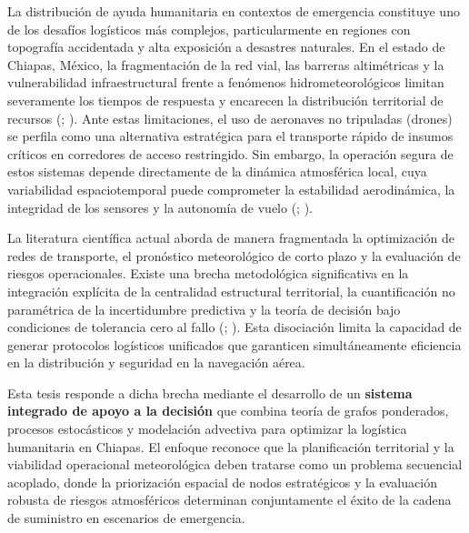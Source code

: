 \documentclass[
  spanish,
  us-letterpaper,
]{scrreprt}
\numberwithin{equation}{section}
\begin{document}
La distribución de ayuda humanitaria en contextos de emergencia
constituye uno de los desafíos logísticos más complejos, particularmente
en regiones con topografía accidentada y alta exposición a desastres
naturales. En el estado de Chiapas, México, la fragmentación de la red
vial, las barreras altimétricas y la vulnerabilidad infraestructural
frente a fenómenos hidrometeorológicos limitan severamente los tiempos
de respuesta y encarecen la distribución territorial de recursos
(;
). Ante estas
limitaciones, el uso de aeronaves no tripuladas (drones) se perfila como
una alternativa estratégica para el transporte rápido de insumos
críticos en corredores de acceso restringido. Sin embargo, la operación
segura de estos sistemas depende directamente de la dinámica atmosférica
local, cuya variabilidad espaciotemporal puede comprometer la
estabilidad aerodinámica, la integridad de los sensores y la autonomía
de vuelo (; ).

La literatura científica actual aborda de manera fragmentada la
optimización de redes de transporte, el pronóstico meteorológico de
corto plazo y la evaluación de riesgos operacionales. Existe una brecha
metodológica significativa en la integración explícita de la centralidad
estructural territorial, la cuantificación no paramétrica de la
incertidumbre predictiva y la teoría de decisión bajo condiciones de
tolerancia cero al fallo (; ). Esta
disociación limita la capacidad de generar protocolos logísticos
unificados que garanticen simultáneamente eficiencia en la distribución
y seguridad en la navegación aérea.

Esta tesis responde a dicha brecha mediante el desarrollo de un
\textbf{sistema integrado de apoyo a la decisión} que combina teoría de
grafos ponderados, procesos estocásticos y modelación advectiva para
optimizar la logística humanitaria en Chiapas. El enfoque reconoce que
la planificación territorial y la viabilidad operacional meteorológica
deben tratarse como un problema secuencial acoplado, donde la
priorización espacial de nodos estratégicos y la evaluación robusta de
riesgos atmosféricos determinan conjuntamente el éxito de la cadena de
suministro en escenarios de emergencia.
\end{document}
